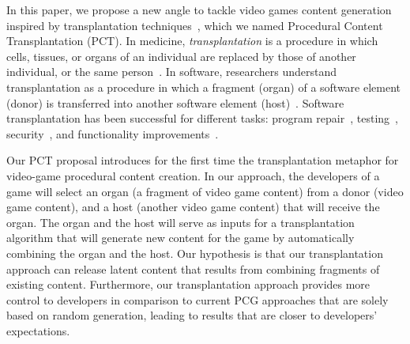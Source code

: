 In this paper, we propose a new angle to tackle video games content generation inspired by transplantation techniques~\cite{barr2015automated}, which we named Procedural Content Transplantation (PCT). In medicine, \textit{transplantation} is a procedure in which cells, tissues, or organs of an individual are replaced by those of another individual, or the same person~\cite{FARSHBAFNADI2023599}. In software, researchers understand transplantation as a procedure in which a fragment (organ) of a software element (donor) is transferred into another software element (host)~\cite{barr2015automated}. Software transplantation has been successful for different tasks: program repair~\cite{weimer2009automatically,sidiroglou2014automatic}, testing~\cite{zhang2017automated}, security~\cite{yang2017malware}, and functionality improvements~\cite{sidiroglou2017codecarboncopy}.

Our PCT proposal introduces for the first time the transplantation metaphor for video-game procedural content creation. In our approach, the developers of a game will select an organ (a fragment of video game content) from a donor (video game content), and a host (another video game content) that will receive the organ. The organ and the host will serve as inputs for a transplantation algorithm that will generate new content for the game by automatically combining the organ and the host. Our hypothesis is that our transplantation approach can release latent content that results from combining fragments of existing content. Furthermore, our transplantation approach provides more control to developers in comparison to current PCG approaches that are solely based on random generation, leading to results that are closer to developers' expectations.


